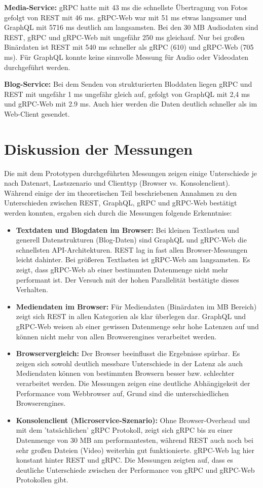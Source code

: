 \textbf{Media-Service:}  
gRPC hatte mit 43 ms die schnellste Übertragung von Fotos gefolgt von REST mit 46 ms. gRPC-Web war mit 51 ms etwas langsamer und GraphQL mit 5716 ms deutlich am langsamsten. Bei den 30 MB Audiodaten sind REST, gRPC und gRPC-Web mit ungefähr 250 ms gleichauf. Nur bei großen Binärdaten ist REST mit 540 ms schneller als gRPC (610) und gRPC-Web (705 ms). Für GraphQL konnte keine sinnvolle Messung für Audio oder Videodaten durchgeführt werden.

\textbf{Blog-Service:}  
Bei dem Senden von strukturierten Bloddaten liegen gRPC und REST mit ungefähr 1 ms ungefähr gleich auf, gefolgt von GraphQL mit 2,4 ms und gRPC-Web mit 2.9 ms. Auch hier werden die Daten deutlich schneller als im Web-Client gesendet.

\clearpage
\section*{Diskussion der Messungen}
Die mit dem Prototypen durchgeführten Messungen zeigen einige Unterschiede je nach Datenart, Lastszenario und Clienttyp (Browser vs. Konsolenclient). Während einige der im theoretischen Teil beschriebenen Annahmen zu den Unterschieden zwischen REST, GraphQL, gRPC und gRPC-Web bestätigt werden konnten, ergaben sich durch die Messungen folgende Erkenntnise:

\begin{itemize}
	\item \textbf{Textdaten und Blogdaten im Browser:} Bei kleinen Textlasten und generell Datenstrukturen (Blog-Daten) sind GraphQL und gRPC-Web die schnellsten API-Architekturen. REST lag in fast allen Browser-Messungen leicht dahinter. Bei größeren Textlasten ist gRPC-Web am langsamsten. Es zeigt, dass gRPC-Web ab einer bestimmten Datenmenge nicht mehr performant ist. Der Versuch mit der hohen Parallelität bestätigte dieses Verhalten.
	\item \textbf{Mediendaten im Browser:} Für Mediendaten (Binärdaten im MB Bereich) zeigt sich REST in allen Kategorien als klar überlegen dar. GraphQL und gRPC-Web weisen ab einer gewissen Datenmenge sehr hohe Latenzen auf und können nicht mehr von allen Browserengines verarbeitet werden.
	
	\item \textbf{Browservergleich:} Der Browser beeinflusst die Ergebnisse spürbar. Es zeigen sich sowohl deutlich messbare Unterschiede in der Latenz als auch Mediendaten können von bestimmten Browsern besser bzw. schlechter verarbeitet werden. Die Messungen zeigen eine deutliche Abhängigekeit der Performance vom Webbrowser auf, Grund sind die unterschiedlichen Browserengines.
	
	\item \textbf{Konsolenclient (Microservice-Szenario):} Ohne Browser-Overhead und mit dem 'tatsächlichen' gRPC Protokoll, zeigt sich gRPC bis zu einer Datenmenge von 30 MB am performantesten, während REST auch noch bei sehr großen Dateien (Video) weiterhin gut funktionierte. gRPC-Web lag hier konstant hinter REST und gRPC. Die Messungen zeigten auf, dass es deutliche Unterschiede zwischen der Performance von gRPC und gRPC-Web Protokollen gibt.
\end{itemize}

